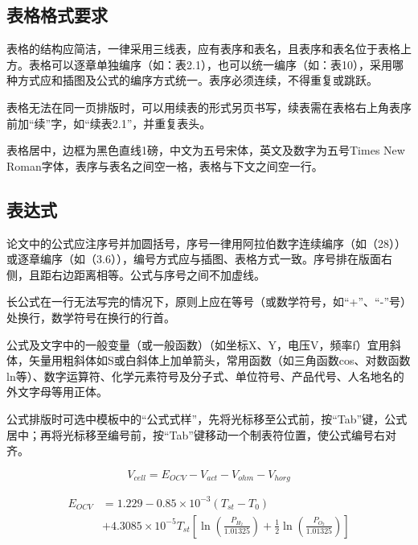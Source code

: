 \begin{spacing}{1.5}
    \subsection{表格格式要求}
    
    表格的结构应简洁，一律采用三线表，应有表序和表名，且表序和表名位于表格上方。表格可以逐章单独编序（如：表2.1），也可以统一编序（如：表10），采用哪种方式应和插图及公式的编序方式统一。表序必须连续，不得重复或跳跃。
    
    表格无法在同一页排版时，可以用续表的形式另页书写，续表需在表格右上角表序前加“续”字，如“续表2.1”，并重复表头。
    
    表格居中，边框为黑色直线1磅，中文为五号宋体，英文及数字为五号Times New Roman字体，表序与表名之间空一格，表格与下文之间空一行。
    
    
    \subsection{表达式}
    
    论文中的公式应注序号并加圆括号，序号一律用阿拉伯数字连续编序（如（28））或逐章编序（如（3.6）），编号方式应与插图、表格方式一致。序号排在版面右侧，且距右边距离相等。公式与序号之间不加虚线。
    
    长公式在一行无法写完的情况下，原则上应在等号（或数学符号，如“+”、“-”号）处换行，数学符号在换行的行首。
    
    公式及文字中的一般变量（或一般函数）（如坐标X、Y，电压V，频率f）宜用斜体，矢量用粗斜体如S或白斜体上加单箭头，常用函数（如三角函数cos、对数函数ln等）、数字运算符、化学元素符号及分子式、单位符号、产品代号、人名地名的外文字母等用正体。
    
    公式排版时可选中模板中的“公式式样”，先将光标移至公式前，按“Tab”键，公式居中；再将光标移至编号前，按“Tab”键移动一个制表符位置，使公式编号右对齐。
    
    \begin{equation}
        V_{cell} = E_{OCV} - V_{act}- V_{ohm}- V_{horg}    
    \end{equation}
    
    \begin{equation}
        \begin{aligned}
            E_{OCV} &= 1.229-0.85\times 10^{-3}(T_{st}-T_0)\\
                    &+4.3085\times 10^{-5}T_{st}\left[\ln(\frac{P_{H_2}}{1.01325})+\frac{1}{2}\ln(\frac{P_{O_2}}{1.01325})\right]
        \end{aligned}
    \end{equation}
    

\end{spacing}
